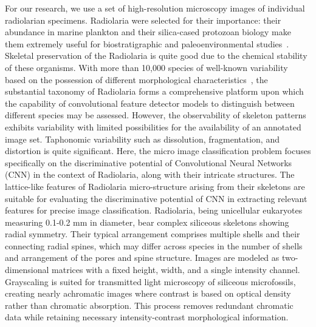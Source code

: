 \documentclass[a4paper,fleqn]{cas-sc}
\begin{document}
For our research, we use a set of high-resolution microscopy images of individual radiolarian specimens. Radiolaria were selected for their importance: their abundance in marine plankton and their silica-cased protozoan biology make them extremely useful for biostratigraphic and paleoenvironmental studies~\cite{brombacher2020radiolarian}. Skeletal preservation of the Radiolaria is quite good due to the chemical stability of these organisms. With more than 10,000 species of well-known variability based on the possession of different morphological characteristics~\cite{brombacher2020radiolarian}, the substantial taxonomy of Radiolaria forms a comprehensive platform upon which the capability of convolutional feature detector models to distinguish between different species may be assessed. However, the observability of skeleton patterns exhibits variability with limited possibilities for the availability of an annotated image set. Taphonomic variability such as dissolution, fragmentation, and distortion is quite significant.
Here, the micro image classification problem focuses specifically on the discriminative potential of Convolutional Neural Networks (CNN) in the context of Radiolaria, along with their intricate structures. The lattice-like features of Radiolaria micro-structure arising from their skeletons are suitable for evaluating the discriminative potential of CNN in extracting relevant features for precise image classification. Radiolaria, being unicellular eukaryotes measuring 0.1-0.2 mm in diameter, bear complex siliceous skeletons showing radial symmetry. Their typical arrangement comprises multiple shells and their connecting radial spines, which may differ across species in the number of shells and arrangement of the pores and spine structure.
Images are modeled as two-dimensional matrices with a fixed height, width, and a single intensity channel. Grayscaling is suited for transmitted light microscopy of siliceous microfossils, creating nearly achromatic images where contrast is based on optical density rather than chromatic absorption. This process removes redundant chromatic data while retaining necessary intensity-contrast morphological information.
\end{document}
